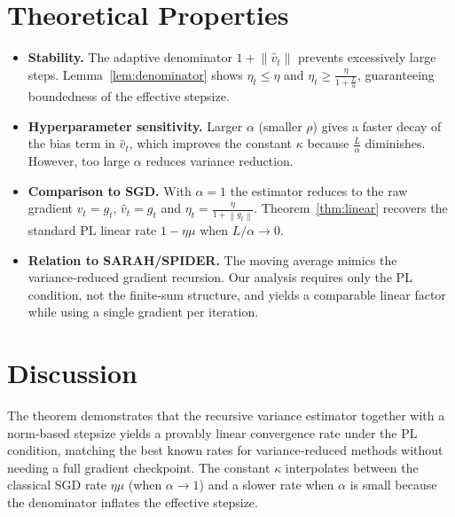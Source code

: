 \documentclass{article}
\newcommand{\norm}[1]{\left\|#1\right\|}
\begin{document}
\section*{Theoretical Properties}
\begin{itemize}
    \item \textbf{Stability.} The adaptive denominator $1+\norm{\hat v_t}$ prevents excessively large steps. Lemma~\ref{lem:denominator} shows $\eta_t\le \eta$ and $\eta_t\ge \frac{\eta}{1+\frac{L}{\alpha}}$, guaranteeing boundedness of the effective stepsize.
    \item \textbf{Hyperparameter sensitivity.} Larger $\alpha$ (smaller $\rho$) gives a faster decay of the bias term in $\hat v_t$, which improves the constant $\kappa$ because $\frac{L}{\alpha}$ diminishes. However, too large $\alpha$ reduces variance reduction.
    \item \textbf{Comparison to SGD.} With $\alpha=1$ the estimator reduces to the raw gradient $v_t=g_t$, $\hat v_t=g_t$ and $\eta_t=\frac{\eta}{1+\norm{g_t}}$. Theorem~\ref{thm:linear} recovers the standard PL linear rate $1-\eta\mu$ when $L/\alpha\to0$.
    \item \textbf{Relation to SARAH/SPIDER.} The moving average mimics the variance‑reduced gradient recursion. Our analysis requires only the PL condition, not the finite‑sum structure, and yields a comparable linear factor while using a single gradient per iteration.
\end{itemize}

\section*{Discussion}
The theorem demonstrates that the recursive variance estimator together with a norm‑based stepsize yields a provably linear convergence rate under the PL condition, matching the best known rates for variance‑reduced methods without needing a full gradient checkpoint. The constant $\kappa$ interpolates between the classical SGD rate $ \eta\mu $ (when $\alpha\to 1$) and a slower rate when $\alpha$ is small because the denominator inflates the effective stepsize.

\newpage
\end{document}
